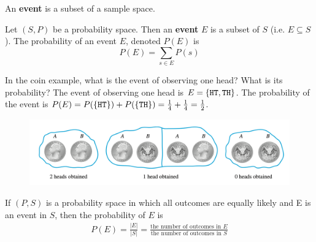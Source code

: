 \documentclass[10pt]{beamer}
\begin{document}
\begin{frame}
\small 
\begin{myredbox}[title=Overview]
An \textbf{event} is a subset of a sample space.  
\end{myredbox}
\vfill \pause
\begin{mygreenbox}[title=Definition]
Let $(S,P)$ be a probability space.  Then an \textbf{event} $E$ is a subset of $S$ (i.e. $E \subseteq S$).  The probability of an event $E$, denoted $P(E)$ is
\[ P(E) = \sum_{s \in E} P(s) \]
\end{mygreenbox}
\vfill \pause

\begin{myyellowbox}[title=Poll]
In the coin example, what is the event of observing one head?  What is its probability? \pause  The event of observing one head is $E = \{ {\texttt{HT}, \texttt{TH}} \}$.  \pause The probability of the event is $P(E) = P(\{ {\texttt{HT}} \}) + P(\{ {\texttt{TH}} \}) = \frac{1}{4} + \frac{1}{4} = \frac{1}{2}$. \pause 
	
\begin{figure}
\includegraphics[width=.8\textwidth]{images/coins_2.png}	
\end{figure}

\end{myyellowbox}


\end{frame}



\begin{frame}
\begin{mygreenbox}[title=Equally Likely Probability Formula]
If $(P,S)$ is a probability space in which all outcomes are equally likely and E is an event in $S$, then the probability of $E$ is
%
\begin{align*}
P(E) = \frac{|E|}{|S|} = \frac{\text{the number of outcomes in } E }{\text{the number of outcomes in } S}	
\end{align*}
\end{mygreenbox}

\end{frame}
\end{document}
